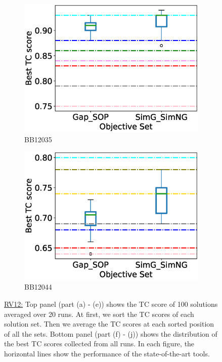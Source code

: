\begin{figure}[!htbp]
\begin{adjustwidth}{-1cm}{-1cm}
\begin{subfigure}{0.22\textwidth}
			\includegraphics[width=\columnwidth]{Figure/summary/precomputedInit/Balibase/BB12035_objset_tc_rank_2}
			\caption{BB12035}
		\end{subfigure}
		\begin{subfigure}{0.22\textwidth}
			\includegraphics[width=\columnwidth]{Figure/summary/precomputedInit/Balibase/BB12044_objset_tc_rank_2}
			\caption{BB12044}
		\end{subfigure}
		\caption{\underline{RV12:} Top panel (part (a) - (e)) shows the TC score of 100 solutions averaged over 20 runs. At first, we sort the TC scores of each solution set. Then we average the TC scores at each sorted position of all the sets. Bottom panel (part (f) - (j)) shows the distribution of the best TC scores collected from all runs. In each figure, the horizontal lines show the performance of the state-of-the-art tools.}
		\label{fig:rv12_tc}
	\end{adjustwidth}
\end{figure}


